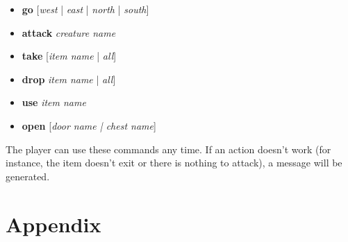 \documentclass[dvips,12pt]{article}
\begin{document}
\begin{itemize}
	\item{\textbf{go} [\emph{west} | \emph{east} | \emph{north} | \emph{south}]}
	\item{\textbf{attack} \emph{creature name}}
	\item{\textbf{take} [\emph{item name} | \emph{all}]}
	\item{\textbf{drop} \emph{item name} | \emph{all}]}
	\item{\textbf{use} \emph{item name}}
	\item{\textbf{open} [\emph{\emph{door name} | \emph{chest name}}]}
\end{itemize}

The player can use these commands any time. If an action doesn't work (for instance, the item doesn't exit or there is nothing to attack), a message will be generated.

\section{Appendix}
\label{App:xml}
\end{document}
